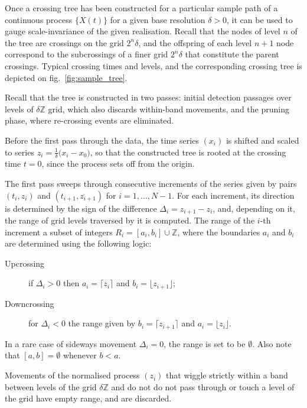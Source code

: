 \documentclass[a4paper]{article}
\begin{document}
Once a crossing tree has been constructed for a particular sample path of a continuous
process $\{X(t)\}$ for a given base resolution $\delta>0$, it can be used to gauge
scale-invariance of the given realisation. Recall that the nodes of level $n$ of
the tree are crossings on the grid $2^n\delta$, and the offspring of each level
$n+1$ node correspond to the subcrossings of a finer grid $2^n\delta$ that constitute
the parent crossings. Typical crossing times and levels, and the corresponding crossing
tree is depicted on fig.~\ref{fig:sample_tree}.


Recall that the tree is constructed in two passes: initial detection passages over
levels of $\delta \mathbb{Z}$ grid, which also discards within-band movements, and
the pruning phase, where re-crossing events are eliminated.

Before the first pass through the data, the time series $(x_i)$ is shifted and scaled
to series $z_i = \frac{1}{ \delta }\bigl(x_i - x_0\bigr)$, so that the constructed
tree is rooted at the crossing time $t=0$, since the process sets off from the origin.

The first pass sweeps through consecutive increments of the series given by pairs
$(t_i, z_i)$ and $(t_{i+1}, z_{i+1})$ for $i=1, \ldots, N-1$. For each increment,
its direction is determined by the sign of the difference $\Delta_i=z_{i+1}-z_i$,
and, depending on it, the range of grid levels traversed by it is computed. The
range of the $i$-th increment a subset of integers $R_i = [a_i,b_i]\cup\mathbb{Z}$,
where the boundaries $a_i$ and $b_i$ are determined using the following logic:
\begin{description}
    \item[Upcrossing] if $\Delta_i > 0$ then $a_i = \lceil z_i \rceil$
    and $b_i = \lfloor z_{i+1}\rfloor$;
    \item[Downcrossing] for $\Delta_i < 0$ the range given by $b_i = \lceil z_{i+1} \rceil$
    and $a_i = \lfloor z_i\rfloor$.
\end{description}
In a rare case of sideways movement $\Delta_i = 0$, the range is set to be $\emptyset$.
Also note that $[a,b] = \emptyset$ whenever $b<a$.

Movements of the normalised process $(z_i)$ that wiggle strictly within a band between
levels of the grid $\delta \mathbb{Z}$ and do not do not pass through or touch a level
of the grid have empty range, and are discarded.
\end{document}
